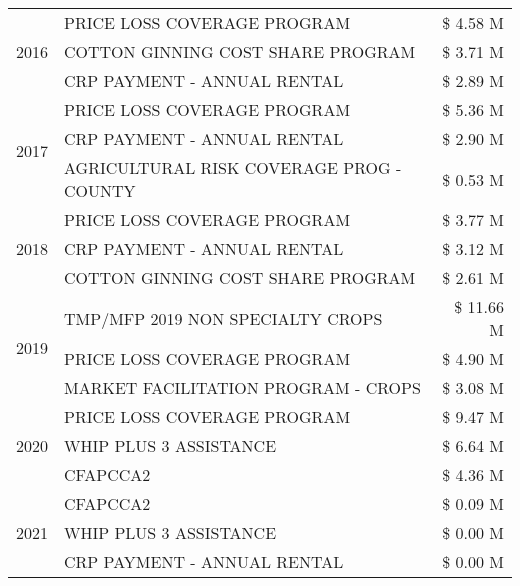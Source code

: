 \begin{tabular}{llr}
\cline{1-3}
\multirow[t]{3}{*}{2016} & PRICE LOSS COVERAGE PROGRAM & \$ 4.58 M \\
 & COTTON GINNING COST SHARE PROGRAM & \$ 3.71 M \\
 & CRP PAYMENT - ANNUAL RENTAL & \$ 2.89 M \\
\cline{1-3}
\multirow[t]{3}{*}{2017} & PRICE LOSS COVERAGE PROGRAM & \$ 5.36 M \\
 & CRP PAYMENT - ANNUAL RENTAL & \$ 2.90 M \\
 & AGRICULTURAL RISK COVERAGE PROG - COUNTY & \$ 0.53 M \\
\cline{1-3}
\multirow[t]{3}{*}{2018} & PRICE LOSS COVERAGE PROGRAM & \$ 3.77 M \\
 & CRP PAYMENT - ANNUAL RENTAL & \$ 3.12 M \\
 & COTTON GINNING COST SHARE PROGRAM & \$ 2.61 M \\
\cline{1-3}
\multirow[t]{3}{*}{2019} & TMP/MFP 2019 NON SPECIALTY CROPS & \$ 11.66 M \\
 & PRICE LOSS COVERAGE PROGRAM & \$ 4.90 M \\
 & MARKET FACILITATION PROGRAM - CROPS & \$ 3.08 M \\
\cline{1-3}
\multirow[t]{3}{*}{2020} & PRICE LOSS COVERAGE PROGRAM & \$ 9.47 M \\
 & WHIP PLUS 3 ASSISTANCE & \$ 6.64 M \\
 & CFAPCCA2 & \$ 4.36 M \\
\cline{1-3}
\multirow[t]{3}{*}{2021} & CFAPCCA2 & \$ 0.09 M \\
 & WHIP PLUS 3 ASSISTANCE & \$ 0.00 M \\
 & CRP PAYMENT - ANNUAL RENTAL & \$ 0.00 M \\
\cline{1-3}
\bottomrule
\end{tabular}
